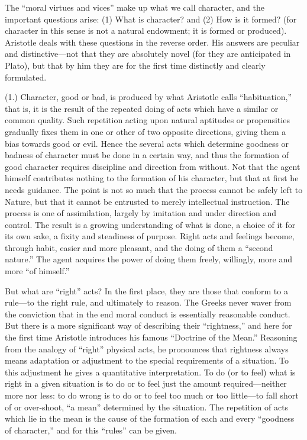 The “moral virtues and vices” make up what we call character, and
the important questions arise: (1) What is character? and (2) How is it formed?
(for character in this sense is not a natural endowment; it is formed or
produced). Aristotle deals with these questions in the reverse order. His
answers are peculiar and distinctive—not that they are absolutely novel
(for they are anticipated in Plato), but that by him they are for the first
time distinctly and clearly formulated.

(1.) Character, good or bad, is produced by what Aristotle calls
“habituation,” that is, it is the result of the repeated doing of
acts which have a similar or common quality. Such repetition acting upon
natural aptitudes or propensities gradually fixes them in one or other of two
opposite directions, giving them a bias towards good or evil. Hence the several
acts which determine goodness or badness of character must be done in a certain
way, and thus the formation of good character requires discipline and direction
from without. Not that the agent himself contributes nothing to the formation
of his character, but that at first he needs guidance. The point is not so much
that the process cannot be safely left to Nature, but that it cannot be
entrusted to merely intellectual instruction. The process is one of
assimilation, largely by imitation and under direction and control. The result
is a growing understanding of what is done, a choice of it for its own sake, a
fixity and steadiness of purpose. Right acts and feelings become, through
habit, easier and more pleasant, and the doing of them a “second
nature.” The agent acquires the power of doing them freely, willingly,
more and more “of himself.”

But what are “right” acts? In the first place, they are those that
conform to a rule—to the right rule, and ultimately to reason. The Greeks
never waver from the conviction that in the end moral conduct is essentially
reasonable conduct. But there is a more significant way of describing their
“rightness,” and here for the first time Aristotle introduces his
famous “Doctrine of the Mean.” Reasoning from the analogy of
“right” physical acts, he pronounces that rightness always means
adaptation or adjustment to the special requirements of a situation. To this
adjustment he gives a quantitative interpretation. To do (or to feel) what is
right in a given situation is to do or to feel just the amount
required—neither more nor less: to do wrong is to do or to feel too much
or too little—to fall short of or over-shoot, “a mean”
determined by the situation. The repetition of acts which lie in the mean is
the cause of the formation of each and every “goodness of
character,” and for this “rules” can be given.

